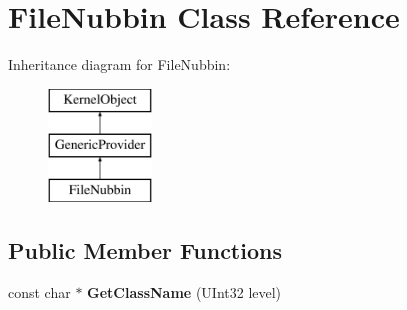 \hypertarget{class_file_nubbin}{}\section{File\+Nubbin Class Reference}
\label{class_file_nubbin}
Inheritance diagram for File\+Nubbin\+:\begin{figure}[H]
\begin{center}
\leavevmode
\includegraphics[height=3.000000cm]{class_file_nubbin}
\end{center}
\end{figure}
\subsection*{Public Member Functions}
\begin{DoxyCompactItemize}
\item 
\mbox{\label{class_file_nubbin_a3610e343611cec037ed204aad82ce162}} 
const char $\ast$ {\bfseries Get\+Class\+Name} (U\+Int32 level)
\end{DoxyCompactItemize}
